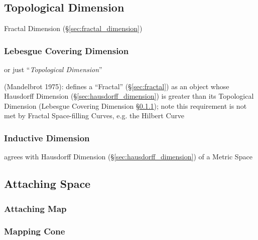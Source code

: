 \subsection{Topological Dimension}\label{sec:topological_dimension}

\fist Fractal Dimension (\S\ref{sec:fractal_dimension})



\subsubsection{Lebesgue Covering Dimension}\label{sec:lebesgue_dimension}

or just ``\emph{Topological Dimension}''

(Mandelbrot 1975): defines a ``Fractal'' (\S\ref{sec:fractal}) as an object
whose Hausdorff Dimension (\S\ref{sec:hausdorff_dimension}) is greater than its
Topological Dimension (Lebesgue Covering Dimension
\S\ref{sec:lebesgue_dimension}); note this requirement is not met by Fractal
Space-filling Curves, e.g. the Hilbert Curve



\subsubsection{Inductive Dimension}\label{sec:inductive_dimension}

agrees with Hausdorff Dimension (\S\ref{sec:hausdorff_dimension}) of a Metric
Space



\subsection{Attaching Space}\label{sec:attaching_space}

\subsubsection{Attaching Map}\label{sec:attaching_map}

\subsubsection{Mapping Cone}\label{sec:mapping_cone}



